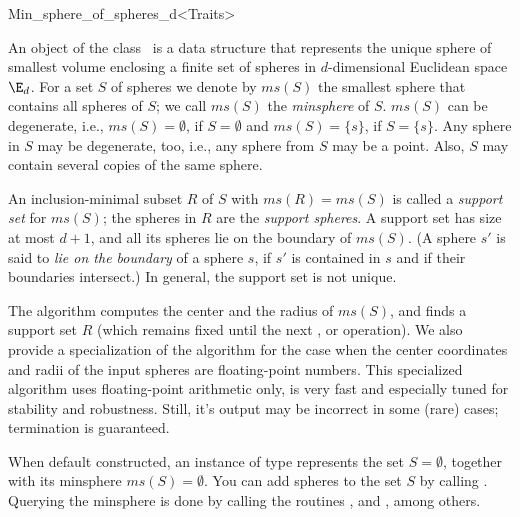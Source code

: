
\begin{ccRefClass}{Min_sphere_of_spheres_d<Traits>}

\ccDefinition

An object of the class \ccRefName\ is a data structure that represents
the unique sphere of smallest volume enclosing a finite set of spheres
in $d$-dimensional Euclidean space $\E_d$.  For a set $S$ of spheres
we denote by $ms(S)$ the smallest sphere that contains all spheres of
$S$; we call $ms(S)$ the \emph{minsphere} of $S$. $ms(S)$ can be
degenerate, i.e., $ms(S)=\emptyset$,
if $S=\emptyset$ and $ms(S)=\{s\}$,
if $S=\{s\}$.  Any sphere in $S$ may be degenerate, too, i.e., any
sphere from $S$ may be a point.  Also, $S$ may contain several
copies of the same sphere.

An inclusion-minimal subset $R$ of $S$ with $ms(R)=ms(S)$ is called a
\emph{support set} for $ms(S)$; the spheres in $R$ are the
\emph{support spheres}.  A support set has size at most $d+1$, and all
its spheres lie on the boundary of $ms(S)$. (A sphere $s'$ is said to
\emph{lie on the boundary} of a sphere $s$, if $s'$ is contained in $s$
and if their boundaries intersect.)  In general, the support set is
not unique.

The algorithm computes the center and the radius of $ms(S)$, and finds
a support set $R$ (which remains fixed until the next ,
 or  operation).  We also provide a
specialization of the algorithm for the case when the center
coordinates and radii of the input spheres are floating-point numbers.
This specialized algorithm uses floating-point arithmetic only, is
very fast and especially tuned for stability and robustness.  Still,
it's output may be incorrect in some (rare) cases; termination is
guaranteed.

When default constructed, an instance of type
 represents the set
$S=\emptyset$, together with its minsphere $ms(S)=\emptyset$.  You can
add spheres to the set $S$ by calling .  Querying the
minsphere is done by calling the routines ,
 and , among others.


\end{ccRefClass}
